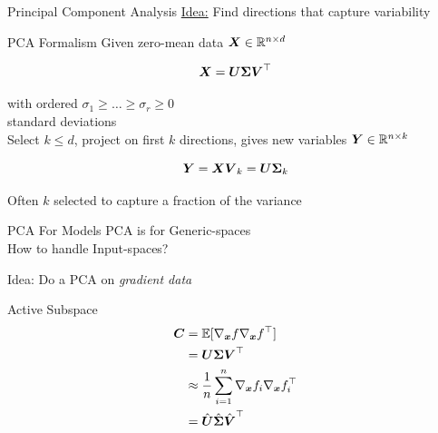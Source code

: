 \documentclass[14pt]{beamer}
\begin{document}
\begin{frame}{Principal Component Analysis}
  \huge\underline{Idea:} Find directions that capture variability
\end{frame}


\begin{frame}{PCA Formalism}
  Given zero-mean data $\boldsymbol{X}\in\mathbb{R}^{n\times d}$

  \begin{equation*}
    \boldsymbol{X} = \boldsymbol{U}\boldsymbol{\Sigma}\boldsymbol{V}^{\top}
  \end{equation*}

  \noindent with ordered $\sigma_1\geq\dots\geq\sigma_r\geq0$\\
  standard deviations \\

  Select $k \leq d$, project on first $k$ directions, gives new variables
  $\boldsymbol{Y}\in\mathbb{R}^{n\times k}$

  \begin{equation*}
    \boldsymbol{Y} = \boldsymbol{X}\boldsymbol{V}_k = \boldsymbol{U}\boldsymbol{\Sigma}_k
  \end{equation*}

  Often $k$ selected to capture a fraction of the variance
\end{frame}

\begin{frame}{PCA For Models}
  PCA is for Generic-spaces \\
  How to handle Input-spaces?

  \bigskip Idea: Do a PCA on \emph{gradient data}
\end{frame}


\begin{frame}{Active Subspace}
  \begin{equation*} \begin{aligned}
      \boldsymbol{C} &= \mathbb{E}[\nabla_{\boldsymbol{x}}f\nabla_{\boldsymbol{x}}f^{\top}] \\
          &= \boldsymbol{U}\boldsymbol{\Sigma}\boldsymbol{V}^{\top} \\
          &\approx \frac{1}{n}\sum_{i=1}^n \nabla_{\boldsymbol{x}}f_i\nabla_{\boldsymbol{x}}f^{\top}_i \\
          &= \hat{\boldsymbol{U}}\hat{\boldsymbol{\Sigma}}\hat{\boldsymbol{V}}^{\top}
  \end{aligned} \end{equation*}

\end{frame}
\end{document}
